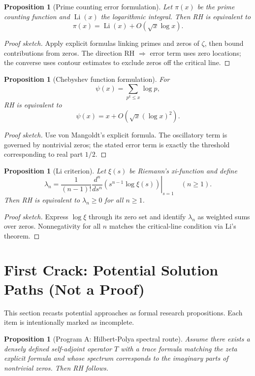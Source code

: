 \documentclass[11pt]{article}
\theoremstyle{plain}
\newtheorem{proposition}[theorem]{Proposition}
\theoremstyle{definition}
\theoremstyle{remark}
\begin{document}
\begin{proposition}[Prime counting error formulation]
Let $\pi(x)$ be the prime counting function and $\operatorname{Li}(x)$ the logarithmic integral.
Then RH is equivalent to
\[
\pi(x)=\operatorname{Li}(x)+O\!\left(\sqrt{x}\log x\right).
\]
\end{proposition}

\begin{proof}[Proof sketch]
Apply explicit formulas linking primes and zeros of $\zeta$, then bound contributions from zeros.
The direction RH $\Rightarrow$ error term uses zero locations; the converse uses contour estimates to
exclude zeros off the critical line.
\end{proof}

\begin{proposition}[Chebyshev function formulation]
For
\[
\psi(x)=\sum_{p^k\le x}\log p,
\]
RH is equivalent to
\[
\psi(x)=x+O\!\left(\sqrt{x}(\log x)^2\right).
\]
\end{proposition}

\begin{proof}[Proof sketch]
Use von Mangoldt's explicit formula. The oscillatory term is governed by nontrivial zeros; the stated
error term is exactly the threshold corresponding to real part $1/2$.
\end{proof}

\begin{proposition}[Li criterion]
Let $\xi(s)$ be Riemann's xi-function and define
\[
\lambda_n = \frac{1}{(n-1)!}\left.\frac{d^n}{ds^n}\left(s^{n-1}\log\xi(s)\right)\right|_{s=1}
\quad (n\ge 1).
\]
Then RH is equivalent to $\lambda_n\ge 0$ for all $n\ge 1$.
\end{proposition}

\begin{proof}[Proof sketch]
Express $\log\xi$ through its zero set and identify $\lambda_n$ as weighted sums over zeros.
Nonnegativity for all $n$ matches the critical-line condition via Li's theorem.
\end{proof}

\section{First Crack: Potential Solution Paths (Not a Proof)}
This section recasts potential approaches as formal research propositions.
Each item is intentionally marked as incomplete.

\begin{proposition}[Program A: Hilbert-Polya spectral route]
Assume there exists a densely defined self-adjoint operator $T$ with a trace formula matching the
zeta explicit formula and whose spectrum corresponds to the imaginary parts of nontrivial zeros.
Then RH follows.
\end{proposition}
\end{document}
